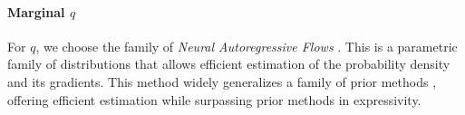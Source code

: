 \documentclass[11pt,letterpaper]{article}
\newcounter{theorem}
\newtheorem{proposition}[theorem]{Proposition}
\begin{document}
\paragraph{Marginal $q$}
For $q$, we choose the family of \emph{Neural Autoregressive Flows} \citep{huang-neural-2018}. 
This is a parametric family of distributions that allows efficient estimation of the probability density and its gradients.
This method widely generalizes a family of prior methods \citep{rezende-variational-2015, kingma-improving-2016, papamakarios-masked-2017}, offering efficient estimation while surpassing prior methods in expressivity.


%
%




%	
%	
%	
%
%
%
%
%
%
%
%
\end{document}
